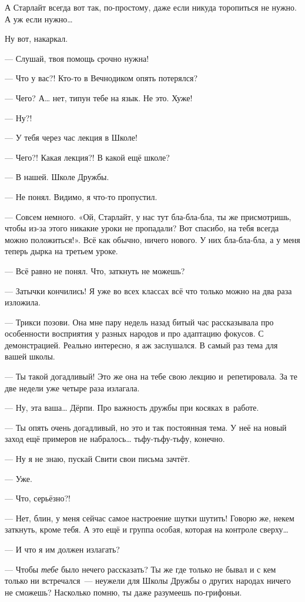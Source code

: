 \documentclass[fontsize=11pt,a5paper,titlepage=firstcover]{scrbook}
\begin{document}
А Старлайт всегда вот так, по-простому, даже если никуда торопиться не нужно. А уж если нужно{\ldots}

Ну вот, накаркал.

--- Слушай, твоя помощь срочно нужна!

--- Что у вас?! Кто-то в Вечнодиком опять потерялся?

--- Чего? А{\ldots} нет, типун тебе на язык. Не это. Хуже!

--- Ну?!

--- У тебя через час лекция в Школе!

--- Чего?! Какая лекция?! В какой ещё школе?

--- В нашей. Школе Дружбы.

--- Не понял. Видимо, я что-то пропустил.

--- Совсем немного. «Ой, Старлайт, у нас тут бла-бла-бла, ты же присмотришь, чтобы из-за этого никакие уроки не пропадали? Вот спасибо, на тебя всегда можно положиться!». Всё как обычно, ничего нового. У них бла-бла-бла, а у меня теперь дырка на третьем уроке.

--- Всё равно не понял. Что, заткнуть не можешь?

--- Затычки кончились! Я уже во всех классах всё что только можно на два раза изложила.

--- Трикси позови. Она мне пару недель назад битый час рассказывала про особенности восприятия у разных народов и про адаптацию фокусов. С демонстрацией. Реально интересно, я аж заслушался. В самый раз тема для вашей школы.

--- Ты такой догадливый! Это же она на тебе свою лекцию и~репетировала. За те две недели уже четыре раза излагала.

--- Ну, эта ваша{\ldots} Дёрпи. Про важность дружбы при косяках в~работе.

--- Ты опять очень догадливый, но это и так постоянная тема. У неё на новый заход ещё примеров не набралось{\ldots} тьфу-тьфу-тьфу, конечно.

--- Ну я не знаю, пускай Свити свои письма зачтёт.

--- Уже.

--- Что, серьёзно?!

--- Нет, блин, у меня сейчас самое настроение шутки шутить! Говорю же, некем заткнуть, кроме тебя. А это ещё и группа особая, которая на контроле сверху{\ldots}

--- И что я им должен излагать?

--- Чтобы \emph{тебе} было нечего рассказать? Ты же где только не бывал и с кем только ни встречался~--- неужели для Школы Дружбы о других народах ничего не сможешь? Насколько помню, ты даже разумеешь по-грифоньи.
\end{document}
